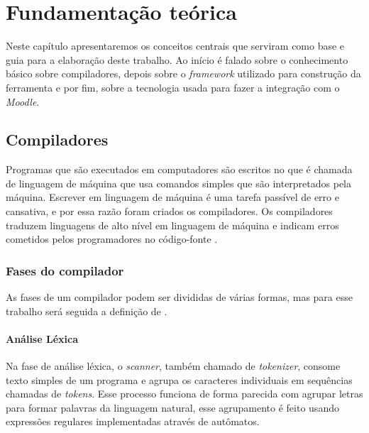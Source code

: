 \chapter{Fundamentação teórica}
\label{cap:fundamentacao-teorica}

Neste capítulo apresentaremos os conceitos centrais que serviram como base e guia para a elaboração deste trabalho. Ao início é falado sobre o conhecimento básico sobre compiladores, depois sobre o \textit{framework} utilizado para construção da ferramenta e por fim, sobre a tecnologia usada para fazer a integração com o \textit{Moodle}.

\section{Compiladores}
Programas que são executados em computadores são escritos no que é chamada de linguagem de máquina que usa comandos simples que são interpretados pela máquina. Escrever em linguagem de máquina é uma tarefa passível de erro e cansativa, e por essa razão foram criados os compiladores. Os compiladores traduzem linguagens de alto nível em linguagem de máquina e indicam erros cometidos pelos programadores no código-fonte \cite{mogensen2024introduction}.

\subsection{Fases do compilador}
As fases de um compilador podem ser divididas de várias formas, mas para esse trabalho será seguida a definição de \textcite{thain2020introduction}. 


\begin{figure}[ht]
    \captionsetup{width=16cm}
\end{figure}

\subsubsection{Análise Léxica}
Na fase de análise léxica, o \textit{scanner}, também chamado de \textit{tokenizer}, consome texto simples de um programa e agrupa os caracteres individuais em sequências chamadas de \textit{tokens}. Esse processo funciona de forma parecida com agrupar letras para formar palavras da linguagem natural, esse agrupamento é feito usando expressões regulares implementadas através de autômatos.


